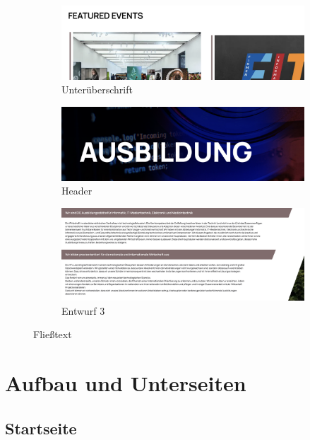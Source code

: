 \begin{figure}
   \centering
   \begin{subfigure}{0.3\textwidth}
     \includegraphics[width=\textwidth]{pics/manrope1.png}
     \caption{Unterüberschrift}
     \label{fig:man:a}
   \end{subfigure}
   \hfill
   \begin{subfigure}{0.3\textwidth}
     \includegraphics[width=\textwidth]{pics/manrope2.png}
     \caption{Header}
     \label{fig:man:b}
   \end{subfigure}
   \hfill
   \begin{subfigure}{0.3\textwidth}
     \includegraphics[width=\textwidth]{pics/manrope3.png}
     \caption{Entwurf 3}
     \label{fig:man:c}
   \end{subfigure}
   \caption{Fließtext}
   \label{fig:impl:erste_entwuerfe}
 \end{figure}


\section{Aufbau und Unterseiten}


\subsection{Startseite}

